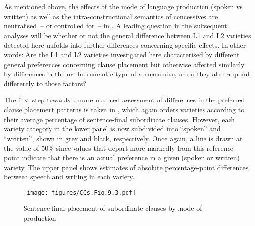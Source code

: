 As mentioned above, the effects of the mode of language production (spoken vs written) as well as the intra-constructional semantics of concessives are neutralised~– or controlled for~– in . A leading question in the subsequent analyses will be whether or not the general difference between L1 and L2 varieties detected here unfolds into further differences concerning specific effects. In other words: Are the L1 and L2 varieties investigated here characterised by different general preferences concerning clause placement but otherwise affected similarly by differences in the  or the semantic type of a concessive, or do they also respond differently to those factors?

The first step towards a more nuanced assessment of differences in the preferred clause placement patterns is taken in , which again orders varieties according to their average percentage of sentence-final subordinate clauses. However, each variety category in the lower panel is now subdivided into “spoken” and “written”, shown in grey and black, respectively. Once again, a line is drawn at the value of 50\% since values that depart more markedly from this reference point indicate that there is an actual preference in a given (spoken or written) variety. The upper panel shows estimates of absolute percentage-point differences between speech and writing in each variety.

\begin{figure}
\texttt{[image: figures/CCs.Fig.9.3.pdf]}
\caption{\label{bkm:Ref51140714}\label{fig:9.3}Sentence-final placement of subordinate clauses by mode of production}
\end{figure}

